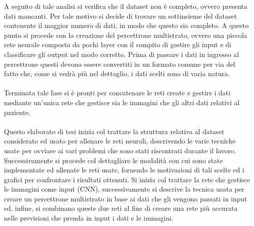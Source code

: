 A seguito di tale analisi si verifica che il dataset non è completo, ovvero presenta dati mancanti. Per tale motivo si decide di 
trovare un sottinsieme del dataset contenente il maggior numero di dati, in modo che questo sia completo.
A questo punto si procede con la creazione del percettrone multistrato, ovvero una piccola rete neurale composta da pochi layer con il compito 
di gestire gli input e di classificare gli output nel modo corretto.
Prima di passare i dati in ingresso al percettrone questi devono essere convertiti in un formato comune per via del fatto che, come si vedrà 
più nel dettaglio, i dati scelti sono di varia natura.
\\\\
Terminata tale fase si è pronti per concatenare le reti create e gestire i dati mediante un'unica rete che gestisce sia le immagini che gli altri dati 
relativi al paziente.
\\\\
Questo elaborato di tesi inizia col trattare la struttura relativa al dataset considerato ed usato per allenare le 
reti neurali, descrivendo le varie tecniche usate per ovviare ai vari problemi che sono stati riscontrati durante il lavoro.
Successivamente si procede col dettagliare le modalità con cui sono state implementate ed allenate le reti usate, fornendo le motivazioni
di tali scelte ed i grafici per confrontare i risultati ottenuti.
Si inizia col trattare la rete che gestisce le immagini come input (CNN), successivamente si descrive la tecnica usata per creare 
un percettrone multistrato in base ai dati che gli vengono passati in input ed, infine, si combinano queste due reti al fine 
di creare una rete più accurata nelle previsioni che prenda in input i dati e le immagini.  
